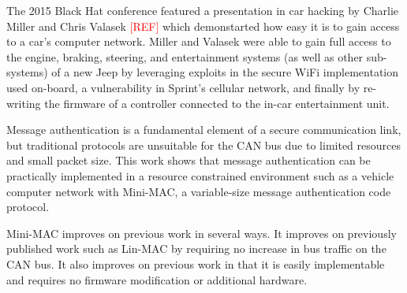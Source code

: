 




The 2015 Black Hat conference featured a presentation in car hacking by Charlie Miller and Chris Valasek \textcolor{red}{[REF]} which demonstarted how easy it is to gain access to a car's computer network. Miller and Valasek were able to gain full access to the engine, braking, steering, and entertainment systems (as well as other sub-systems) of a new Jeep by leveraging exploits in the secure WiFi implementation used on-board, a vulnerability in Sprint's cellular network, and finally by re-writing the firmware of a controller connected to the in-car entertainment unit.

Message authentication is a fundamental element of a secure communication link, but traditional protocols are unsuitable for the CAN bus due to limited resources and small packet size. This work shows that message authentication can be practically implemented in a resource constrained environment such as a vehicle computer network with Mini-MAC, a variable-size message authentication code protocol.

Mini-MAC improves on previous work in several ways. It improves on previously published work such as Lin-MAC \cite{Lin-MAC} by requiring no increase in bus traffic on the CAN bus. It also improves on previous work in that it is easily implementable and requires no firmware modification or additional hardware. 

